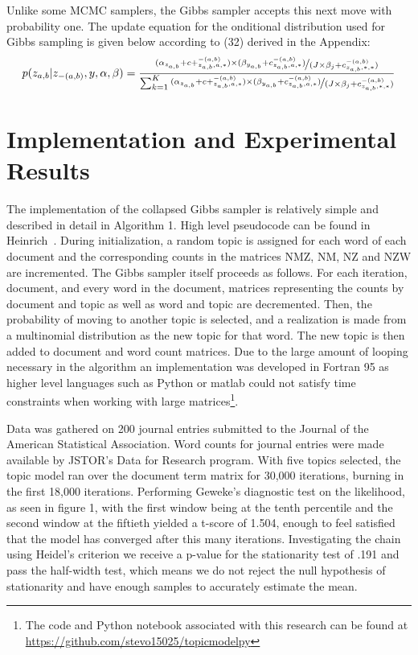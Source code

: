\documentclass{article}%
\theoremstyle{definition}
\begin{document}
\noindent Unlike some MCMC samplers, the Gibbs sampler accepts this next move with probability one. The update equation for the onditional distribution used for Gibbs sampling is given below according to (32) derived in the Appendix:
\begin{equation}
p(z_{a,b}|z_{-(a,b)},y,\alpha,\beta) = \frac{\nicefrac{(\alpha_{z_{a,b}}+ c+_{z_{a,b},a,*}^{-(a,b)})\times(\beta_{y_{a,b}}+c_{z_{a,b},a,*}^{-(a,b)})}{(J \times \beta_j + c_{z_{a,b},*,*}^{-(a,b)})}}{\sum_{k=1}^{K}\nicefrac{(\alpha_{z_{a,b}}+ c+_{z_{a,b},a,*}^{-(a,b)})\times(\beta_{y_{a,b}}+c_{z_{a,b},a,*}^{-(a,b)})}{(J \times \beta_j + c_{z_{a,b},*,*}^{-(a,b)})}}
\end{equation}

\section{Implementation and Experimental Results}
\label{sec:implementation}
The implementation of the collapsed Gibbs sampler is relatively simple and described in detail in Algorithm 1. High level pseudocode can be found in Heinrich~\cite{Heinrich04parameterestimation}. During initialization, a random topic is assigned for each word of each document and the corresponding counts in the matrices NMZ, NM, NZ and NZW are incremented. The Gibbs sampler itself proceeds as follows. For each iteration, document, and every word in the document, matrices representing the counts by document and topic as well as word and topic are decremented. Then, the probability of moving to another topic is selected, and a realization is made from a multinomial distribution as the new topic for that word. The new topic is then added to document and word count matrices. Due to the large amount of looping necessary in the algorithm an implementation was developed in Fortran 95 as higher level languages such as Python or matlab could not satisfy time constraints when working with large matrices\footnote{The code and Python notebook associated with this research can be found at \url{https://github.com/stevo15025/topicmodelpy}}.

Data was gathered on 200 journal entries submitted to the Journal of the American Statistical Association. Word counts for journal entries were made available by JSTOR's Data for Research program. With five topics selected, the topic model ran over the document term matrix for 30,000 iterations, burning in the first 18,000 iterations. Performing Geweke's \cite{Geweke92evaluatingthe} diagnostic test on the likelihood, as seen in figure 1, with the first window being at the tenth percentile and the second window at the fiftieth yielded a t-score of 1.504, enough to feel satisfied that the model has converged after this many iterations. Investigating the chain using Heidel's criterion \cite{doi:10.1287/opre.31.6.1109}  we receive a p-value for the stationarity test of .191 and pass the half-width test, which means we do not reject the null hypothesis of stationarity and have enough samples to accurately estimate the mean. 
\end{document}
